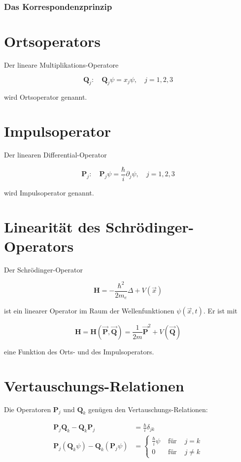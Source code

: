 \documentclass[10pt, letterpaper]{article}
\begin{document}
\subsubsection*{Das Korrespondenzprinzip}
\section*{Ortsoperators}
Der lineare Multiplikations-Operatore

$$
\mathbf{Q}_{j}: \quad \mathbf{Q}_{j} \psi=x_{j} \psi, \quad j=1,2,3
$$

wird Ortsoperator genannt.

\section*{Impulsoperator}
Der linearen Differential-Operator

$$
\mathbf{P}_{j}: \quad \mathbf{P}_{j} \psi=\frac{\hbar}{i} \partial_{j} \psi, \quad j=1,2,3
$$

wird Impulsoperator genannt.

\section*{Linearität des Schrödinger-Operators}
Der Schrödinger-Operator

$$
\mathbf{H}=-\frac{\hbar^{2}}{2 m_{e}} \Delta+V(\vec{x})
$$

ist ein linearer Operator im Raum der Wellenfunktionen $\psi(\vec{x}, t)$. Er ist mit

$$
\mathbf{H}=\mathbf{H}(\overrightarrow{\mathbf{P}}, \overrightarrow{\mathbf{Q}})=\frac{1}{2 m} \overrightarrow{\mathbf{P}}^{2}+V(\overrightarrow{\mathbf{Q}})
$$

eine Funktion des Orts- und des Impulsoperators.

\section*{Vertauschungs-Relationen}
Die Operatoren $\mathbf{P}_{j}$ und $\mathbf{Q}_{k}$ genügen den Vertauschungs-Relationen:

$$
\begin{aligned}
\mathbf{P}_{j} \mathbf{Q}_{k}-\mathbf{Q}_{k} \mathbf{P}_{j} & =\frac{\hbar}{i} \delta_{j k} \\
\mathbf{P}_{j}\left(\mathbf{Q}_{k} \psi\right)-\mathbf{Q}_{k}\left(\mathbf{P}_{j} \psi\right) & =\left\{\begin{array}{rll}
\frac{\hbar}{i} \psi & \text { für } & j=k \\
0 & \text { für } & j \neq k
\end{array}\right.
\end{aligned}
$$
\end{document}

